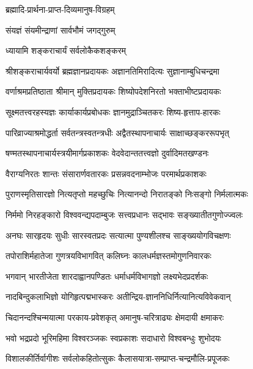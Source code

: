 

{ब्रह्मादि-प्रार्थना-प्राप्त-दिव्यमानुष-विग्रहम्}

{संयज्ञं संयमीन्द्राणां सार्वभौमं जगद्गुरुम्}

{ध्यायामि शङ्कराचार्यं सर्वलोकैकशङ्करम् }

\twolineshloka
{श्रीशङ्कराचार्यवर्यो ब्रह्मज्ञानप्रदायकः}
{अज्ञानतिमिरादित्यः सुज्ञानाम्बुधिचन्द्रमा}

\twolineshloka
{वर्णाश्रमप्रतिष्ठाता श्रीमान् मुक्तिप्रदायकः}
{शिष्योपदेशनिरतो भक्ताभीष्टप्रदायकः}

\twolineshloka
{सूक्ष्मतत्त्वरहस्यज्ञः कार्याकार्यप्रबोधकः}
{ज्ञानमुद्राञ्चितकरः शिष्य-हृत्ताप-हारकः}

\twolineshloka
{पारिव्राज्याश्रमोद्धर्ता सर्वतन्त्रस्वतन्त्रधीः}
{अद्वैतस्थापनाचार्यः साक्षाच्छङ्कररूपभृत्}

\twolineshloka
{षण्मतस्थापनाचार्यस्त्रयीमार्गप्रकाशकः}
{वेदवेदान्ततत्त्वज्ञो दुर्वादिमतखण्डनः}

\twolineshloka
{वैराग्यनिरतः शान्तः संसारार्णवतारकः}
{प्रसन्नवदनाम्भोजः परमार्थप्रकाशकः}

\twolineshloka
{पुराणस्मृतिसारज्ञो नित्यतृप्तो महच्छुचिः}
{नित्यानन्दो निरातङ्को निःसङ्गो निर्मलात्मकः}

\twolineshloka
{निर्ममो निरहङ्कारो विश्ववन्द्यपदाम्बुजः}
{सत्त्वप्रधानः सद्भावः सङ्ख्यातीतगुणोज्ज्वलः}

\twolineshloka
{अनघः सारहृदयः सुधीः सारस्वतप्रदः}
{सत्यात्मा पुण्यशीलश्च साङ्ख्ययोगविचक्षणः}

\twolineshloka
{तपोराशिर्महातेजा गुणत्रयविभागवित्}
{कलिघ्नः कालधर्मज्ञस्तमोगुणनिवारकः}

\twolineshloka
{भगवान् भारतीजेता शारदाह्वानपण्डितः}
{धर्माधर्मविभागज्ञो लक्ष्यभेदप्रदर्शकः}

\twolineshloka
{नादबिन्दुकलाभिज्ञो योगिहृत्पद्मभास्करः}
{अतीन्द्रिय-ज्ञाननिधिर्नित्यानित्यविवेकवान्}

\twolineshloka
{चिदानन्दश्चिन्मयात्मा परकाय-प्रवेशकृत्}
{अमानुष-चरित्राढ्यः क्षेमदायी क्षमाकरः}

\twolineshloka
{भवो भद्रप्रदो भूरिमहिमा विश्वरञ्जकः}
{स्वप्रकाशः सदाधारो विश्वबन्धुः शुभोदयः}

\twolineshloka
{विशालकीर्तिर्वागीशः सर्वलोकहितोत्सुकः}
{कैलासयात्रा-सम्प्राप्त-चन्द्रमौलि-प्रपूजकः}

